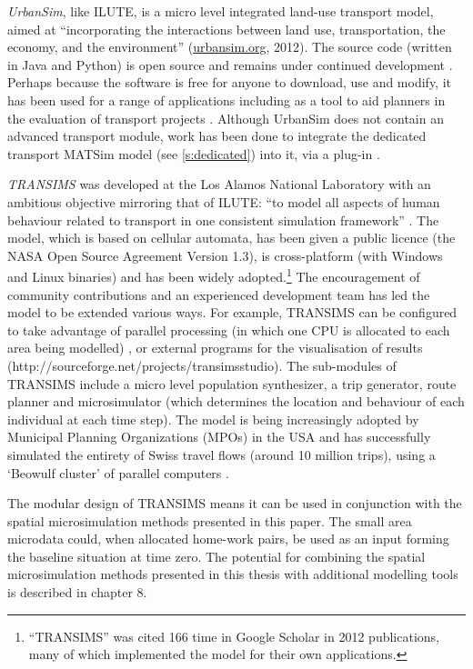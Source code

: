 \emph{UrbanSim}, like ILUTE, is a micro level integrated land-use transport
model, aimed at 
``incorporating the interactions between land use, transportation, the economy,
and the environment'' (\href{http://www.urbansim.org/Main/WebHome}{urbansim.org}, 2012).
The source code (written in Java and Python)
is open source and remains under continued development \citep{Nicolai2012-matsim}.
Perhaps because the software is free for anyone to download, use and modify,
it has been used for a range of applications including as a tool
to aid planners in the evaluation of transport projects \citep{Borning2008}.
Although UrbanSim does not contain an advanced transport module,
work has been done to integrate the dedicated transport MATSim model (see
\cref{s:dedicated}) into it,
via a plug-in \citep{Nicolai2012-matsim}.

\emph{TRANSIMS}  was developed at the Los Alamos National
Laboratory with an
ambitious objective mirroring that of ILUTE:
``to model all aspects of human behaviour related to
transport in one consistent simulation framework''
\citep[p.~1]{nagel1999transims}.  The model, which is based on cellular
automata, has been given a public licence (the NASA Open Source Agreement
Version 1.3), is cross-platform (with Windows and Linux binaries) and has been
widely adopted.\footnote{``TRANSIMS''
was cited 166 time in Google
Scholar in 2012 publications, many of which implemented the model for their own
applications.}
The encouragement of community contributions and an experienced development team
has led the model to be extended various ways. For example, TRANSIMS can be
configured to take advantage of parallel processing (in which one CPU is
allocated to each area being modelled) \citep{nagel2001parallel}, or external
programs for the visualisation of results
(http://sourceforge.net/projects/transimsstudio). The sub-modules of TRANSIMS
include a micro level population synthesizer, a trip generator, route planner
and microsimulator (which determines the location and behaviour of each
individual at each time step). The model is being increasingly adopted by
Municipal Planning Organizations (MPOs) in the USA \citep{lawe2009transims,
ullah2011travel} and has successfully simulated the entirety of Swiss travel
flows (around 10 million trips), using a `Beowulf cluster' of parallel computers
\citep{Raney2003}.

The modular design of TRANSIMS means it can be used in conjunction with the
spatial microsimulation methods presented in this paper. The small area
microdata could, when allocated home-work pairs, be used as an input forming
the baseline situation at time zero. The potential for combining the spatial
microsimulation methods presented in this thesis with additional modelling
tools is described in chapter 8.


